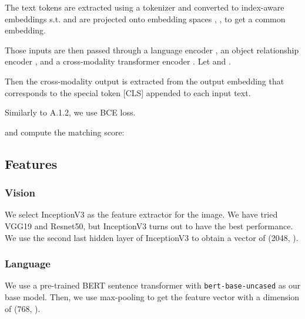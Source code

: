 \documentclass[11pt]{article}
\begin{document}
The text tokens are extracted using a tokenizer \cite{wu2016google} and converted to index-aware embeddings s.t.  and  are projected onto embedding spaces , , to get a common embedding. 
 

Those inputs are then passed through a language encoder , an object relationship encoder , and a cross-modality transformer encoder . Let  and .    

Then the cross-modality output  is extracted from the output embedding  that corresponds to the special token [CLS] appended to each input text. 

Similarly to A.1.2, we use BCE loss.



and compute the matching score:

\subsection{Features}
\subsubsection{Vision}
We select InceptionV3 \cite{DBLP:journals/corr/SzegedyVISW15} as the feature extractor for the image. We have tried VGG19 and Resnet50, but InceptionV3 turns out to have the best performance. We use the second last hidden layer of InceptionV3 to obtain a vector of (2048, ). 

\subsubsection{Language}
We use a pre-trained BERT sentence transformer \cite{reimers-2019-sentence-bert} with \texttt{bert-base-uncased} as our base model. Then, we use max-pooling to get the feature vector with a dimension of (768, ).
\end{document}
